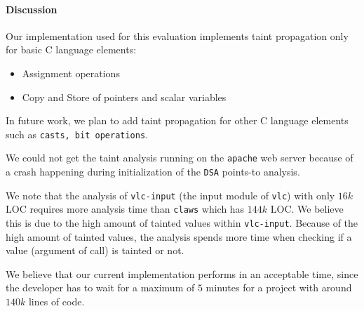 \paragraph{Discussion}

Our implementation used for this evaluation implements taint
propagation only for basic C language elements:
\begin{itemize}
  \item Assignment operations
  \item Copy and Store of pointers and scalar variables
\end{itemize} 
In future work, we plan to add taint propagation for other
C language elements such as {\tt casts, bit operations}.

We could not get the taint analysis running on the \texttt{apache}
web server because of a crash happening during initialization of
the \texttt{DSA} points-to analysis.

We note that the analysis of \texttt{vlc-input} (the input module of
\texttt{vlc}) with only $16k$ LOC requires more analysis time than
\texttt{claws} which has $144k$ LOC. We believe this is due to the
high amount of tainted values within \texttt{vlc-input}. Because
of the high amount of tainted values, the analysis spends more time
when checking if a value (argument of call) is tainted or not.

We believe that our current implementation performs in an acceptable
time, since the developer has to wait for a maximum of $5$ minutes
for a project with around $140k$ lines of code.
